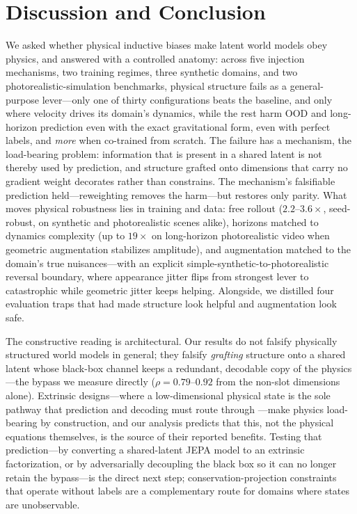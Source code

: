 \section{Discussion and Conclusion}
\label{sec:conclusion}

We asked whether physical inductive biases make latent world models obey physics, and answered with a controlled anatomy: across five injection mechanisms, two training regimes, three synthetic domains, and two photorealistic-simulation benchmarks, physical structure fails as a general-purpose lever---only one of thirty configurations beats the baseline, and only where velocity drives its domain's dynamics, while the rest harm OOD and long-horizon prediction even with the exact gravitational form, even with perfect labels, and \emph{more} when co-trained from scratch. The failure has a mechanism, the load-bearing problem: information that is present in a shared latent is not thereby used by prediction, and structure grafted onto dimensions that carry no gradient weight decorates rather than constrains. The mechanism's falsifiable prediction held---reweighting removes the harm---but restores only parity. What moves physical robustness lies in training and data: free rollout ($2.2$--$3.6\times$, seed-robust, on synthetic and photorealistic scenes alike), horizons matched to dynamics complexity (up to $19\times$ on long-horizon photorealistic video when geometric augmentation stabilizes amplitude), and augmentation matched to the domain's true nuisances---with an explicit simple-synthetic-to-photorealistic reversal boundary, where appearance jitter flips from strongest lever to catastrophic while geometric jitter keeps helping. Alongside, we distilled four evaluation traps that had made structure look helpful and augmentation look safe.

The constructive reading is architectural. Our results do not falsify physically structured world models in general; they falsify \emph{grafting} structure onto a shared latent whose black-box channel keeps a redundant, decodable copy of the physics---the bypass we measure directly ($\rho{=}0.79$--$0.92$ from the non-slot dimensions alone). Extrinsic designs---where a low-dimensional physical state is the sole pathway that prediction and decoding must route through \citep{mao2024piwm}---make physics load-bearing by construction, and our analysis predicts that this, not the physical equations themselves, is the source of their reported benefits. Testing that prediction---by converting a shared-latent JEPA model to an extrinsic factorization, or by adversarially decoupling the black box so it can no longer retain the bypass---is the direct next step; conservation-projection constraints that operate without labels are a complementary route for domains where states are unobservable.

